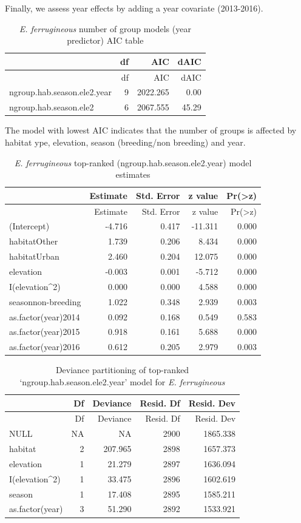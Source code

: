 \documentclass[]{article}
\begin{document}
Finally, we assess year effects by adding a year covariate (2013-2016).

\begin{longtable}[]{@{}lrrr@{}}
\caption{\textit{E. ferrugineous} number of group models (year
predictor) AIC table}\tabularnewline
\toprule
& df & AIC & dAIC\tabularnewline
\midrule
\endfirsthead
\toprule
& df & AIC & dAIC\tabularnewline
\midrule
\endhead
ngroup.hab.season.ele2.year & 9 & 2022.265 & 0.00\tabularnewline
ngroup.hab.season.ele2 & 6 & 2067.555 & 45.29\tabularnewline
\bottomrule
\end{longtable}

The model with lowest AIC indicates that the number of groups is
affected by habitat ype, elevation, season (breeding/non breeding) and
year.

\begin{longtable}[]{@{}lrrrr@{}}
\caption{\textit{E. ferrugineous} top-ranked
(ngroup.hab.season.ele2.year) model estimates}\tabularnewline
\toprule
& Estimate & Std. Error & z value &
Pr(\textgreater{}\textbar{}z\textbar{})\tabularnewline
\midrule
\endfirsthead
\toprule
& Estimate & Std. Error & z value &
Pr(\textgreater{}\textbar{}z\textbar{})\tabularnewline
\midrule
\endhead
(Intercept) & -4.716 & 0.417 & -11.311 & 0.000\tabularnewline
habitatOther & 1.739 & 0.206 & 8.434 & 0.000\tabularnewline
habitatUrban & 2.460 & 0.204 & 12.075 & 0.000\tabularnewline
elevation & -0.003 & 0.001 & -5.712 & 0.000\tabularnewline
I(elevation\^{}2) & 0.000 & 0.000 & 4.588 & 0.000\tabularnewline
seasonnon-breeding & 1.022 & 0.348 & 2.939 & 0.003\tabularnewline
as.factor(year)2014 & 0.092 & 0.168 & 0.549 & 0.583\tabularnewline
as.factor(year)2015 & 0.918 & 0.161 & 5.688 & 0.000\tabularnewline
as.factor(year)2016 & 0.612 & 0.205 & 2.979 & 0.003\tabularnewline
\bottomrule
\end{longtable}

\begin{longtable}[]{@{}lrrrr@{}}
\caption{Deviance partitioning of top-ranked
`ngroup.hab.season.ele2.year' model for
\textit{E. ferrugineous}}\tabularnewline
\toprule
& Df & Deviance & Resid. Df & Resid. Dev\tabularnewline
\midrule
\endfirsthead
\toprule
& Df & Deviance & Resid. Df & Resid. Dev\tabularnewline
\midrule
\endhead
NULL & NA & NA & 2900 & 1865.338\tabularnewline
habitat & 2 & 207.965 & 2898 & 1657.373\tabularnewline
elevation & 1 & 21.279 & 2897 & 1636.094\tabularnewline
I(elevation\^{}2) & 1 & 33.475 & 2896 & 1602.619\tabularnewline
season & 1 & 17.408 & 2895 & 1585.211\tabularnewline
as.factor(year) & 3 & 51.290 & 2892 & 1533.921\tabularnewline
\bottomrule
\end{longtable}
\end{document}
